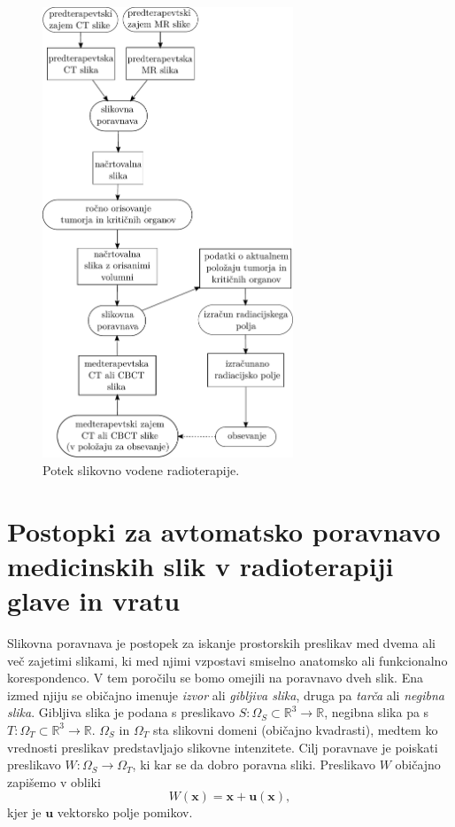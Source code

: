 \documentclass[journal]{IEEEtran}
\begin{document}
\begin{figure} \centering
 \includegraphics[width=7.5cm]{./diagram.pdf}
 \caption{Potek slikovno vodene radioterapije.}
 \label{diagram}
\end{figure}




\section{Postopki za avtomatsko poravnavo medicinskih slik v radioterapiji glave in vratu}


Slikovna poravnava je postopek za iskanje prostorskih preslikav med dvema ali več zajetimi slikami, ki med njimi vzpostavi smiselno anatomsko ali funkcionalno korespondenco. V tem poročilu se bomo omejili na poravnavo dveh slik. Ena izmed njiju se običajno imenuje \emph{izvor} ali \emph{gibljiva slika}, druga pa \emph{tarča} ali \emph{negibna slika}. Gibljiva slika je podana s preslikavo $S\colon\Omega_S\subset\mathbb{R}^3\to\mathbb{R}$, negibna slika pa s $T\colon\Omega_T\subset\mathbb{R}^3\to\mathbb{R}$. $\Omega_S$ in $\Omega_T$ sta slikovni domeni (običajno kvadrasti), medtem ko vrednosti preslikav predstavljajo slikovne intenzitete. Cilj poravnave je poiskati preslikavo $W\colon\Omega_S\to\Omega_T$, ki kar se da dobro poravna sliki. Preslikavo $W$ običajno zapišemo v obliki
\begin{equation}
 W(\boldsymbol{x}) = \boldsymbol{x} + \boldsymbol{u}(\boldsymbol{x}),
\end{equation}
kjer je $\boldsymbol{u}$ vektorsko polje pomikov.
\end{document}
